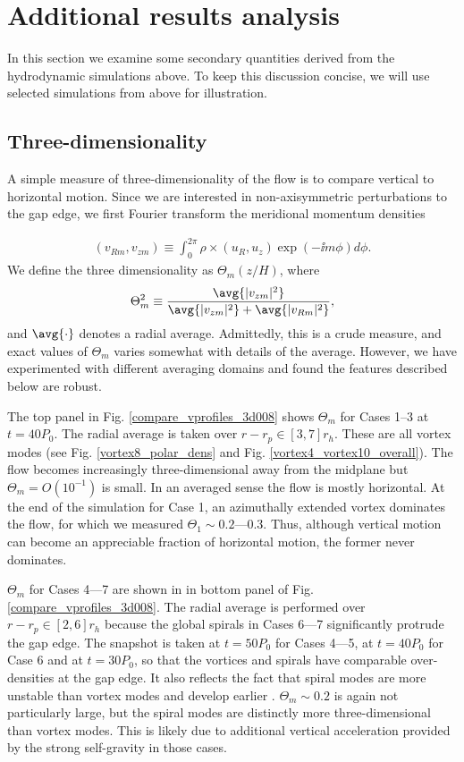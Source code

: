 \section{Additional results analysis}\label{additional}
In this section we examine some secondary quantities derived
from the hydrodynamic simulations above. To keep this discussion
concise, we will use selected simulations from above for illustration.   

\subsection{Three-dimensionality}
A simple measure of three-dimensionality of the flow is to compare vertical 
to horizontal motion. Since we are interested in non-axisymmetric
perturbations to the gap edge, we first Fourier transform the
meridional momentum densities 

\begin{align}
  (v_{Rm}, v_{zm} ) \equiv\int_0^{2\pi}\rho\times(u_R,
  u_z)\exp{(-\ii m\phi)}d\phi. 
\end{align}
We define the three dimensionality as $\Theta_m(z/H)$, where 
\begin{align}
  \Theta_m^2 \equiv \frac{\avg{|v_{zm}|^2}}{\avg{|v_{zm}|^2}
    +\avg{|v_{Rm}|^2}},  
\end{align}
and $\avg{\cdot}$ denotes a radial average. 
Admittedly, this is a crude measure, and exact values of $\Theta_m$
varies somewhat with details of the average. However, we have
experimented with different averaging domains and 
found the features described below are robust.  


The top panel in Fig. \ref{compare_vprofiles_3d008} shows $\Theta_m$
for Cases 1--3 at $t=40P_0$. The radial average is taken over
$r-r_p\in[3,7]r_h$. These are all vortex modes (see
Fig. \ref{vortex8_polar_dens} and
Fig. \ref{vortex4_vortex10_overall}). The flow becomes increasingly
three-dimensional away from the midplane but 
$\Theta_m = O(10^{-1})$ is small. In an averaged sense the flow is
mostly horizontal. At the end of the  
simulation for Case 1, an azimuthally extended vortex dominates the
flow, for which we measured $\Theta_1\sim
0.2$---0.3. Thus, although vertical motion can become an appreciable
fraction of horizontal motion, the former never dominates.  

$\Theta_m$ for Cases 4---7 are shown in in bottom panel of
Fig. \ref{compare_vprofiles_3d008}. The radial average is performed
over $r-r_p\in[2,6]r_h$ 
because the global spirals in Cases 6---7 significantly protrude the
gap edge. The snapshot is taken at $t=50P_0$ for Cases 4---5, at
$t=40P_0$ for Case 6 and at $t=30P_0$, so that the
vortices and spirals have comparable over-densities at the
gap edge. It also reflects the fact that spiral modes are more
unstable than vortex modes and develop earlier  
\citep{lin11b}. $\Theta_m \sim 0.2$ is again not particularly
large, but the spiral modes are distinctly more three-dimensional than
vortex modes. This is likely due to additional vertical
acceleration provided by the strong self-gravity in those cases.   


